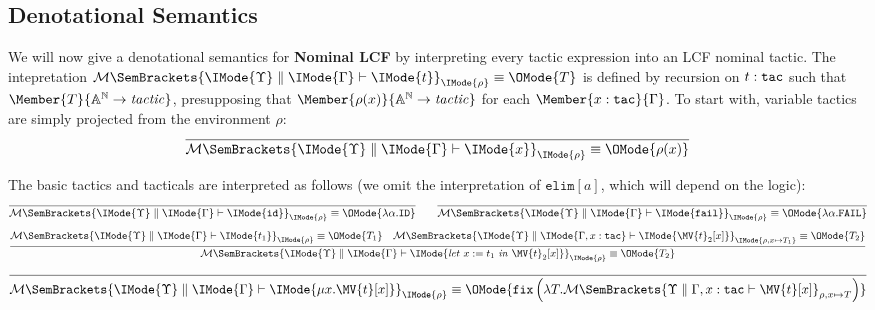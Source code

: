 \subsection{Denotational Semantics}

\newcommand\LCFElaboration[5]{%
  \mathcal{M}%
  \SemBrackets{
    #1\parallel #2\vdash%
    #3%
  }_{#5}%
}

\newcommand\LCFElab[6]{%
  \LCFElaboration{\IMode{#1}}{\IMode{#2}}{\IMode{#3}}{\IMode{#4}}{\IMode{#5}}%
  \equiv\OMode{#6}%
}

We will now give a denotational semantics for \textbf{Nominal LCF} by
interpreting every tactic expression into an LCF nominal tactic. The
intepretation $\LCFElab{\Upsilon}{\Gamma}{t}{\tau}{\rho}{T}$ is defined by
recursion on $t:\mathtt{tac}$ such that $\Member{T}{\LCFNominalTactic}$,
presupposing that $\Member{\rho(x)}{\LCFNominalTactic}$ for each
$\Member{x:\SortTac}{\Gamma}$.  To start with, variable tactics are simply
projected from the environment $\rho$:
\[
  \infer{
    \LCFElab{\Upsilon}{\Gamma}{x}{\SortTac}{\rho}{\rho(x)}
  }{
  }
\]

The basic tactics and tacticals are interpreted as follows (we omit the interpretation of
$\mathtt{elim}[a]$, which will depend on the logic):
\[
  \infer{
    \LCFElab{\Upsilon}{\Gamma}{\mathtt{id}}{\SortTac}{\rho}{
      \lambda\alpha.\mathtt{ID}
    }
  }{
  }
  \qquad
  \infer{
    \LCFElab{\Upsilon}{\Gamma}{\mathtt{fail}}{\SortTac}{\rho}{
      \lambda\alpha.\mathtt{FAIL}
    }
  }{
  }
\]
\[
  \infer{
    \LCFElab{\Upsilon}{\Gamma}{\TacLet{t_1}{x}{\MV{t}_2[x]}}{\SortTac}{\rho}{
      T_2
    }
  }{
    \LCFElab{\Upsilon}{\Gamma}{t_1}{\SortTac}{\rho}{T_1} &
    \LCFElab{\Upsilon}{\Gamma,x:\SortTac}{\MV{t}_2[x]}{\SortTac}{
      \rho,x\mapsto T_1
    }{
      T_2
    }
  }
\]
\[
  \infer{
    \LCFElab{\Upsilon}{\Gamma}{\TacFix{x}{\MV{t}[x]}}{\SortTac}{\rho}{
      \mathtt{fix}%
      \left(\lambda T.
        \LCFElaboration{\Upsilon}{\Gamma,x:\SortTac}{\MV{t}[x]}{\SortTac}{\rho,x\mapsto T}
      \right)
    }
  }{
  }
\]

